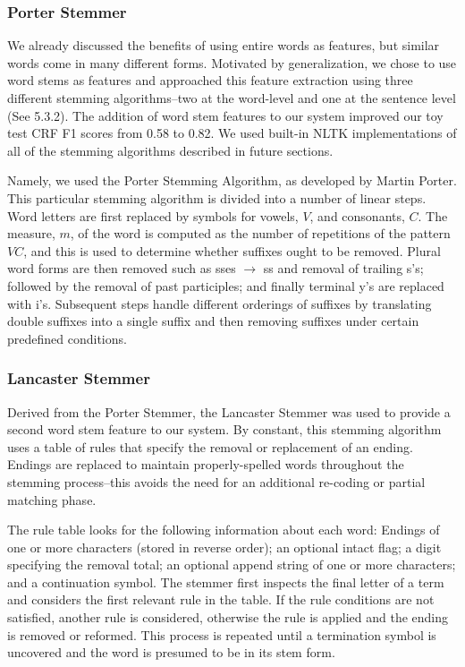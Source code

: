 \documentclass[preprint]{style}
\begin{document}
\subsubsection{Porter Stemmer}
We already discussed the benefits of using entire words as features, but similar words come in many different forms. Motivated by generalization, we chose to use word stems as features and approached this feature extraction using three different stemming algorithms--two at the word-level and one at the sentence level (See 5.3.2). The addition of word stem features to our system improved our toy test CRF F1 scores from 0.58 to 0.82. We used built-in NLTK implementations of all of the stemming algorithms described in future sections.

Namely, we used the Porter Stemming Algorithm, as developed by Martin Porter.  This particular stemming algorithm is divided into a number of linear steps. Word letters are first replaced by symbols for vowels, $V$, and consonants, $C$. The measure, $m$, of the word is computed as the number of repetitions of the pattern $VC$, and this is used to determine whether suffixes ought to be removed. Plural word forms are then removed such as  sses $\rightarrow$ ss and removal of trailing s's; followed by the removal of past participles; and finally terminal y's are replaced with i's. Subsequent steps handle different orderings of suffixes by translating double suffixes into a single suffix and then removing suffixes under certain predefined conditions.

\subsubsection{Lancaster Stemmer}

Derived from the Porter Stemmer, the Lancaster Stemmer was used to provide a second word stem feature to our system. By constant, this stemming algorithm uses a table of rules that specify the removal or replacement of an ending. Endings are replaced to maintain properly-spelled words throughout the stemming process--this avoids the need for an additional re-coding or partial matching phase. 

The rule table looks for the following information about each word: Endings of one or more characters (stored in reverse order); an optional intact flag; a digit specifying the removal total;  an optional append string of one or more characters; and a continuation symbol. The stemmer first inspects the final letter of a term and considers the first relevant rule in the table. If the rule conditions are not satisfied, another rule is considered, otherwise the rule is applied and the ending is removed or reformed. This process is repeated until a termination symbol is uncovered and the word is presumed to be in its stem form.
\end{document}
